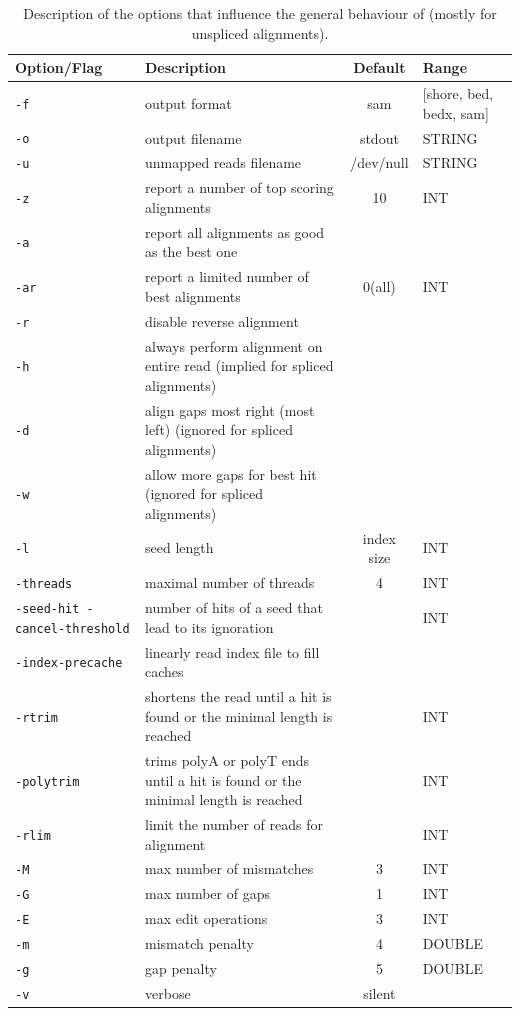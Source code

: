 \documentclass{article}
\begin{document}
\begin{table}[h!]
\begin{tabular}{p{3cm}p{6cm}cp{2cm}}
\hline
Option/Flag&Description&Default&Range\\
\hline
\texttt{-f}& output format&sam& [shore, bed, bedx, sam]\\
\texttt{-o}& output filename & stdout& STRING\\
\texttt{-u}& unmapped reads filename&/dev/null& STRING\\
\texttt{-z}& report a number of top scoring alignments&10&INT\\
\texttt{-a}& report all alignments as good as the best one&&\\
\texttt{-ar}& report a limited number of best alignments&0(all)&INT\\
\texttt{-r}& disable reverse alignment &&\\
\texttt{-h}& always perform alignment on entire read (implied for
spliced alignments)&&\\ 
\texttt{-d}& align gaps most right (most left) (ignored for spliced alignments)&&\\
\texttt{-w}& allow more gaps for best hit (ignored for spliced
alignments)&&\\ 
\texttt{-l}& seed length & index size & INT\\
\texttt{-threads}&maximal number of threads &4&INT\\ 
\texttt{-seed-hit -cancel-threshold}& number of hits of a seed that
lead to its ignoration &&INT\\
\texttt{-index-precache}& linearly read index file to fill caches&&\\
\texttt{-rtrim}&shortens the read until a hit is found or the minimal length is reached&&INT\\
\texttt{-polytrim}& trims polyA or polyT ends until a hit is found or
the minimal length is reached&&INT\\
\texttt{-rlim}& limit the number of reads for alignment&&INT\\
\texttt{-M}& max number of mismatches&3&INT\\
\texttt{-G}& max number of gaps&1&INT\\
\texttt{-E}& max edit operations&3&INT\\
\texttt{-m}& mismatch penalty&4&DOUBLE\\
\texttt{-g}& gap penalty &5&DOUBLE\\
\texttt{-v}& verbose &silent&\\
\hline
\end{tabular}
\caption{Description of the options that influence the general
  behaviour of \PALMapper{} (mostly for unspliced alignments).}
\label{tab:palmapper_param}
\end{table}
\end{document}
